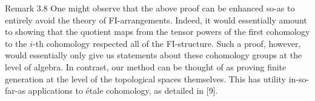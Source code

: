 \begin{sourceblockroman}{Remark 3.8}
One might observe that the above proof can be enhanced so-as to entirely avoid the theory of FI-arrangements. Indeed, it would essentially amount to showing that the quotient maps from the tensor powers of the first cohomology to the $i$-th cohomology respected all of the FI-structure. Such a proof, however, would essentially only give us statements about these cohomology groups at the level of algebra. In contrast, our method can be thought of as proving finite generation at the level of the topological spaces themselves. This has utility in-so-far-as applications to \'etale cohomology, as detailed in [9].
\end{sourceblockroman}
